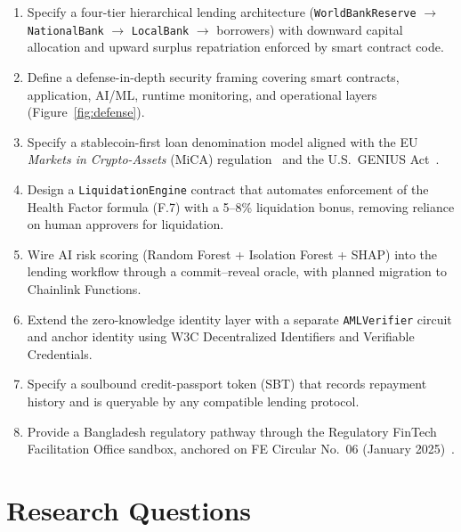 \documentclass[12pt,a4paper]{report}
\begin{document}
\begin{enumerate}[leftmargin=*,itemsep=2pt]
    \item Specify a four-tier hierarchical lending architecture (\texttt{WorldBankReserve} $\to$ \texttt{NationalBank} $\to$ \texttt{LocalBank} $\to$ borrowers) with downward capital allocation and upward surplus repatriation enforced by smart contract code.
    \item Define a defense-in-depth security framing covering smart contracts, application, AI/ML, runtime monitoring, and operational layers (Figure~\ref{fig:defense}).
    \item Specify a stablecoin-first loan denomination model aligned with the EU \emph{Markets in Crypto-Assets} (MiCA) regulation~\cite{micaRegulation,scorechainMica2025} and the U.S.\ GENIUS Act~\cite{geniusAct2025}.
    \item Design a \texttt{LiquidationEngine} contract that automates enforcement of the Health Factor formula (F.7) with a 5--8\% liquidation bonus, removing reliance on human approvers for liquidation.
    \item Wire AI risk scoring (Random Forest + Isolation Forest + SHAP) into the lending workflow through a commit--reveal oracle, with planned migration to Chainlink Functions.
    \item Extend the zero-knowledge identity layer with a separate \texttt{AMLVerifier} circuit and anchor identity using W3C Decentralized Identifiers and Verifiable Credentials.
    \item Specify a soulbound credit-passport token (SBT) that records repayment history and is queryable by any compatible lending protocol.
    \item Provide a Bangladesh regulatory pathway through the Regulatory FinTech Facilitation Office sandbox, anchored on FE Circular No.~06 (January 2025)~\cite{bangladeshFeCircular2025}.
\end{enumerate}

\section{Research Questions}
\label{sec:rq}
\end{document}
